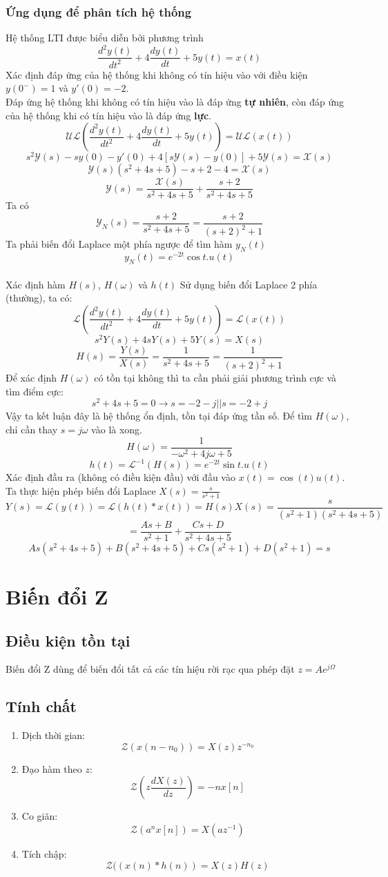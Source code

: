 \documentclass{article}
\begin{document}
\subsubsection{Ứng dụng để phân tích hệ thống}
Hệ thống LTI được biểu diễn bởi phương trình
$$\frac{d^{2}y(t)}{dt^2}+4\frac{dy(t)}{dt}+5y(t)=x(t)$$
Xác định đáp ứng của hệ thống khi không có tín hiệu vào với điều kiện $y(0^{-})=1$ và $y'(0)=-2$.
\\Đáp ứng hệ thống khi không có tín hiệu vào là đáp ứng \textbf{tự nhiên}, còn đáp ứng của hệ thống khi có tín hiệu vào là đáp ứng \textbf{lực}.
$$\mathscr{UL}\left(\frac{d^{2}y(t)}{dt^{2}}+4\frac{dy(t)}{dt}+5y(t)\right)=\mathscr{UL}(x(t))$$
$$s^{2}\mathscr{Y}(s)-sy(0)-y'(0)+4[s\mathscr{Y}(s)-y(0)]+5\mathscr{Y}(s)=\mathscr{X}(s)$$
$$\mathscr{Y}(s)(s^{2}+4s+5)-s+2-4=\mathscr{X}(s)$$
$$\mathscr{Y}(s)=\frac{\mathscr{X}(s)}{s^{2}+4s+5}+\frac{s+2}{s^{2}+4s+5}$$
Ta có $$\mathscr{Y}_{N}(s)=\frac{s+2}{s^{2}+4s+5}=\frac{s+2}{(s+2)^{2}+1}$$
Ta phải biến đổi Laplace một phía ngược để tìm hàm $y_{N}(t)$
$$y_{N}(t)=e^{-2t}\cos{t}.u(t)$$
\\Xác định hàm $H(s)$, $H(\omega)$ và $h(t)$
Sử dụng biến đổi Laplace 2 phía (thường), ta có:
$$\mathscr{L}\left(\frac{d^{2}y(t)}{dt^{2}}+4\frac{dy(t)}{dt}+5y(t)\right)=\mathscr{L}(x(t))$$
$$s^{2}Y(s)+4sY(s)+5Y(s)=X(s)$$
$$H(s)=\frac{Y(s)}{X(s)}=\frac{1}{s^{2}+4s+5}=\frac{1}{(s+2)^2+1}$$
Để xác định $H(\omega)$ có tồn tại không thì ta cần phải giải phương trình cực và tìm điểm cực:
$$s^{2}+4s+5=0\rightarrow s=-2-j || s=-2+j$$
Vậy ta kết luận đây là hệ thống ổn định, tồn tại đáp ứng tần số.
Để tìm $H(\omega)$, chỉ cần thay $s=j\omega$ vào là xong.
$$H(\omega)=\frac{1}{-\omega^{2}+4j\omega+5}$$
$$h(t)=\mathscr{L}^{-1}(H(s))=e^{-2t}\sin{t}.u(t)$$
Xác định đầu ra (không có điều kiện đầu) với đầu vào $x(t)=\cos{(t)}u(t)$. Ta thực 
hiện phép biến đổi Laplace $X(s)=\frac{s}{s^{2}+1}$
$$Y(s)=\mathscr{L}(y(t))=\mathscr{L}(h(t)*x(t))=H(s)X(s)=\frac{s}{(s^{2}+1)(s^{2}+4s+5)}$$$$=\frac{As+B}{s^{2}+1}+\frac{Cs+D}{s^{2}+4s+5}$$
$$As(s^{2}+4s+5)+B(s^{2}+4s+5)+Cs(s^{2}+1)+D(s^{2}+1)=s$$
\section{Biến đổi Z}
\subsection{Điều kiện tồn tại}
Biến đổi Z dùng để biến đổi tất cả các tín hiệu rời rạc qua phép đặt $z=Ae^{j\Omega}$
\subsection{Tính chất}
\begin{enumerate}
    \item Dịch thời gian: $$\mathscr{Z}(x(n-{n_{0}}))=X(z)z^{-n_{0}}$$
    \item Đạo hàm theo $z$: $$\mathscr{Z}\left(z\frac{dX(z)}{dz}\right)=-nx[n]$$
    \item Co giãn: $$\mathscr{Z}(a^{n}x[n])=X(az^{-1})$$
    \item Tích chập: $$\mathscr{Z}((x(n)*h(n))=X(z)H(z)$$
\end{enumerate}
\end{document}
